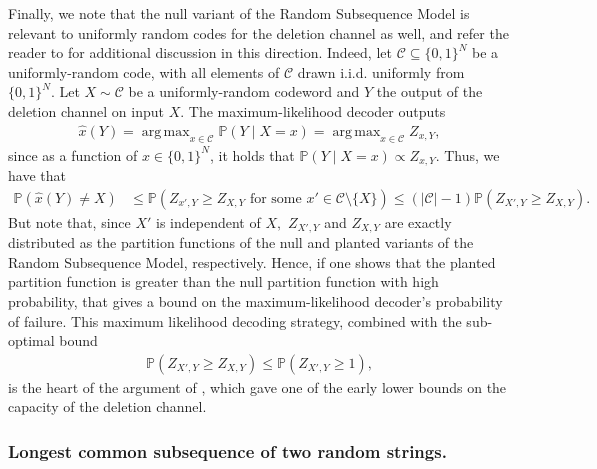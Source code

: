 \documentclass[11pt]{amsart}
\numberwithin{equation}{section}
\numberwithin{equation}{section}
\DeclareMathOperator*{\argmax}{arg\,max}
\newcommand{\1}{\mathbbm{1}}
\newcommand{\Prob}{\mathbb{P}}
\theoremstyle{definition}
\begin{document}
Finally, we note that the null variant of the Random Subsequence Model is relevant to uniformly random codes for the deletion channel as well, and refer the reader to \cite{mitzenmacher2009survey} for additional discussion in this direction. Indeed, let $\mathcal{C}\subseteq \{0,1\}^N$ be a uniformly-random code, with all elements of $\mathcal{C}$ drawn i.i.d. uniformly from $\{0,1\}^N.$ Let $X \sim \mathcal{C}$ be a uniformly-random codeword and $Y$ the output of the deletion channel on input $X$. The maximum-likelihood decoder outputs
\begin{align*}
    \hat{x}(Y)=\argmax_{x\in \mathcal{C}} \Prob(Y \mid X=x) = \argmax_{x\in \mathcal{C}} Z_{x, Y},
\end{align*}
since as a function of $x \in \{0,1\}^N$, it holds that $\Prob(Y \mid X=x) \propto Z_{x, Y}$. Thus, we have that
\begin{align*}
    \Prob\left(\hat{x}(Y)\neq X \right) & \leq \Prob\left( Z_{x',Y} \geq Z_{X,Y} \text{ for some } x' \in \mathcal{C} \setminus \{X\} \right) \leq (|\mathcal{C}| - 1) \Prob\left( Z_{X',Y} \geq Z_{X,Y} \right).
\end{align*}
But note that, since $X'$ is independent of $X,$ $Z_{X',Y}$ and $Z_{X,Y}$ are exactly distributed as the partition functions of the null and planted variants of the Random Subsequence Model, respectively. Hence, if one shows that the planted partition function is greater than the null partition function with high probability, that gives a bound on the maximum-likelihood decoder's probability of failure. This maximum likelihood decoding strategy, combined with the sub-optimal bound
\begin{align*}
    \Prob\left(Z_{X',Y} \geq Z_{X,Y}\right) \leq \Prob\left( Z_{X',Y} \geq 1 \right),
\end{align*}
is the heart of the argument of \cite{gallager1961sequential, zigangirov1969sequential, diggavi2001transmission}, which gave one of the early lower bounds on the capacity of the deletion channel.

\subsubsection{Longest common subsequence of two random strings.} 
\end{document}
